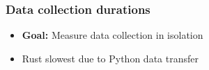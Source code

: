 \documentclass[t,english]{beamer}
\begin{document}
\begin{frame}
    \frametitle{Data collection durations}
        \begin{itemize}
        \item \textbf{Goal:} Measure data collection in isolation
        \end{itemize}
    \begin{itemize}
        \item<3->  Rust slowest due to Python data transfer
    \end{itemize}
\end{frame}
\end{document}
